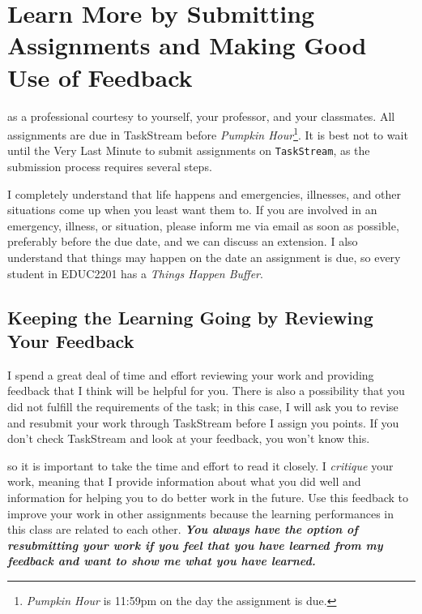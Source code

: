\documentclass{tufte-handout}
\begin{document}
\section{Learn More by Submitting Assignments and Making Good Use of Feedback}
 as a professional courtesy to yourself, your professor, and your classmates. All assignments are due in TaskStream before \textit{Pumpkin Hour}\footnote{\textit{Pumpkin Hour} is 11:59pm on the day the assignment is due.}. It is best not to wait until the Very Last Minute to submit assignments on \texttt{TaskStream}, as the submission process requires several steps.

I completely understand that life happens and emergencies, illnesses, and other situations come up when you least want them to. If you are involved in an emergency, illness, or situation, please inform me via email as soon as possible, preferably before the due date, and we can discuss an extension. I also understand that things may happen on the date an assignment is due, so every student in EDUC2201 has a \textit{Things Happen Buffer}.


\subsection{Keeping the Learning Going by Reviewing Your Feedback}
I spend a great deal of time and effort reviewing your work and providing feedback that I think will be helpful for you. There is also a possibility that you did not fulfill the requirements of the task; in this case, I will ask you to revise and resubmit your work through TaskStream before I assign you points. If you don't check TaskStream and look at your feedback, you won't know this.

 so it is important to take the time and effort to read it closely. I \emph{critique} your work, meaning that I provide information about what you did well and information for helping you to do better work in the future. Use this feedback to improve your work in other assignments because the learning performances in this class are related to each other. \textbf{\emph{You always have the option of resubmitting your work if you feel that you have learned from my feedback and want to show me what you have learned.}}
\end{document}
